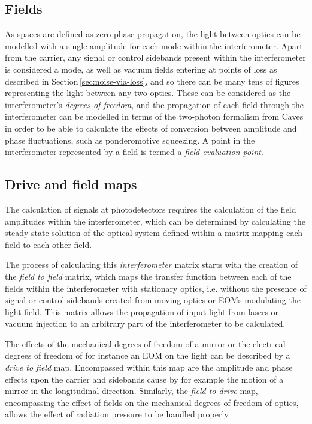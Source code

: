 \subsection{Fields}
As spaces are defined as zero-phase propagation, the light between optics can be modelled with a single amplitude for each mode within the interferometer. Apart from the carrier, any signal or control sidebands present within the interferometer is considered a mode, as well as vacuum fields entering at points of loss as described in Section\,\ref{sec:noise-via-loss}, and so there can be many tens of figures representing the light between any two optics. These can be considered as the interferometer's \emph{degrees of freedom}, and the propagation of each field through the interferometer can be modelled in terms of the two-photon formalism from Caves  in order to be able to calculate the effects of conversion between amplitude and phase fluctuations, such as ponderomotive squeezing. A point in the interferometer represented by a field is termed a \emph{field evaluation point}.

\subsection{Drive and field maps}
The calculation of signals at photodetectors requires the calculation of the field amplitudes within the interferometer, which can be determined by calculating the steady-state solution of the optical system defined within a matrix mapping each field to each other field.

The process of calculating this \emph{interferometer} matrix starts with the creation of the \emph{field to field} matrix, which maps the transfer function between each of the fields within the interferometer with stationary optics, i.e. without the presence of signal or control sidebands created from moving optics or \glspl{EOM} modulating the light field. This matrix allows the propagation of input light from lasers or vacuum injection to an arbitrary part of the interferometer to be calculated.

The effects of the mechanical degrees of freedom of a mirror or the electrical degrees of freedom of for instance an \gls{EOM} on the light can be described by a \emph{drive to field} map. Encompassed within this map are the amplitude and phase effects upon the carrier and sidebands cause by for example the motion of a mirror in the longitudinal direction. Similarly, the \emph{field to drive} map, encompassing the effect of fields on the mechanical degrees of freedom of optics, allows the effect of radiation pressure to be handled properly.


